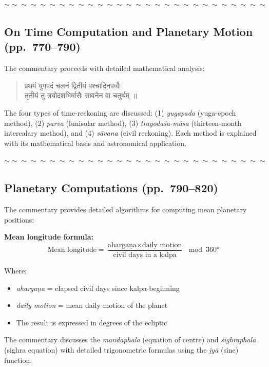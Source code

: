 \documentclass[11pt,a4paper]{article}
\newcommand{\dev}[1]{{\devanagarifont #1}}
\newenvironment{shloka}
  {\begin{verse}\devanagarifont\color{versecolor}}
  {\end{verse}}
\newenvironment{commentary}
  {\small\color{commentarycolor}\par\noindent\ignorespaces}
  {\par}
\newcommand{\wavydivider}{\begin{center}$\sim\sim\sim\sim\sim\sim\sim\sim\sim\sim\sim\sim\sim\sim\sim\sim\sim\sim\sim\sim\sim\sim\sim\sim\sim\sim\sim\sim$\end{center}}
\begin{document}
\wavydivider

\subsection*{On Time Computation and Planetary Motion (pp.\ 770--790)}

The commentary proceeds with detailed mathematical analysis:

\begin{shloka}
\dev{प्रथमं युगपदं चलनं द्वितीयं पश्चादिनपर्व्वैः}\\
\dev{तृतीयं तु त्रयोदशभिर्मासैः सावनेन वा चतुर्थम् ॥}
\end{shloka}

\begin{commentary}
The four types of time-reckoning are discussed: (1) \textit{yugapada} (yuga-epoch method), (2) \textit{parva} (lunisolar method), (3) \textit{trayodaśa-māsa} (thirteen-month intercalary method), and (4) \textit{sāvana} (civil reckoning). Each method is explained with its mathematical basis and astronomical application.
\end{commentary}

\wavydivider

\subsection*{Planetary Computations (pp.\ 790--820)}

The commentary provides detailed algorithms for computing mean planetary positions:

\textbf{Mean longitude formula:}
\begin{equation*}
\text{Mean longitude} = \frac{\text{ahargaṇa} \times \text{daily motion}}{\text{civil days in a kalpa}} \mod 360°
\end{equation*}

Where:
\begin{itemize}[leftmargin=2em]
  \item \textit{ahargaṇa} = elapsed civil days since kalpa-beginning
  \item \textit{daily motion} = mean daily motion of the planet
  \item The result is expressed in degrees of the ecliptic
\end{itemize}

The commentary discusses the \textit{mandaphala} (equation of centre) and \textit{śīghraphala} (sighra equation) with detailed trigonometric formulas using the \textit{jyā} (sine) function.
\end{document}
